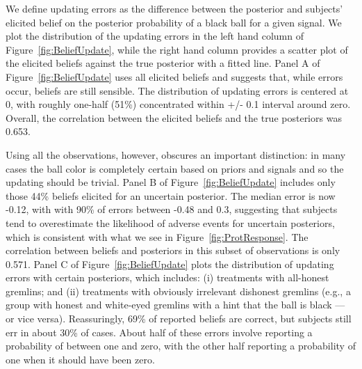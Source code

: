 \documentclass[12pt,a4paper]{article}
\newcommand{\pmt}[1]{{\color{Blue}#1}}
\begin{document}
We define updating errors as the difference between the posterior and subjects' elicited belief on the posterior probability of a black ball for a given signal.  We plot the distribution of the updating errors in the left hand column of Figure~\ref{fig:BeliefUpdate}, while the right hand column provides a scatter plot of the elicited beliefs against the true posterior with a fitted line.
Panel A of Figure~\ref{fig:BeliefUpdate} uses all elicited beliefs and suggests that, while errors occur, beliefs are still sensible. The distribution of updating errors is centered at 0, with roughly one-half (51\%) concentrated within +/- 0.1 interval around zero. Overall, the correlation between the elicited beliefs and the true posteriors was 0.653.  

Using all the observations, however, obscures an important distinction: in many cases the ball color is completely certain based on priors and signals and so the updating should be trivial.  Panel B of Figure~\ref{fig:BeliefUpdate} includes only those 44\% beliefs elicited for an uncertain posterior. The median error is now -0.12, with with 90\% of errors between -0.48 and 0.3, suggesting that subjects tend to overestimate the likelihood of adverse events for uncertain posteriors, \pmt{which is consistent with what we see in Figure~\ref{fig:ProtResponse}}. The correlation between beliefs and posteriors in this subset of observations is only 0.571.  Panel C of Figure~\ref{fig:BeliefUpdate} plots the distribution of updating errors with certain posteriors, which includes: (i) treatments with all-honest gremlins; and (ii) treatments with obviously irrelevant dishonest gremlins (e.g., a group with honest and white-eyed gremlins with a hint that the ball is black --- or vice versa). Reassuringly, 69\% of reported beliefs are correct, but subjects still err in about 30\% of cases. About half of these errors involve reporting a probability of between one and zero, with the other half reporting a probability of one when it should have been zero.
\end{document}
